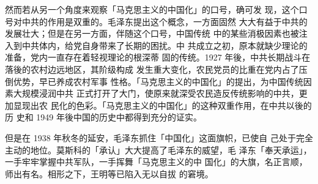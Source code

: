 然而若从另一个角度来观察「马克思主义的中国化」的口号，确可发
现，这个口号对中共的作用是双重的。毛泽东提出这个概念，一方面固然
大大有益于中共的发展壮大；但是在另一方面，伴随这个口号，中国传统
中的某些消极因素也被注入到中共体内，给党自身带来了长期的困扰。中
共成立之初，原本就缺少理论的准备，党内一直存在着轻视理论的根深蒂
固的传统。1927 年後，中共长期战斗在落後的农村边远地区，其阶级构成
发生重大变化，农民党员的比重在党内占了压倒优势，早已养成农村军事
性格。「马克思主义的中国化」的提出，为中国传统因素大规模浸润中共
正式打开了大门，使原来就深受农民造反传统影响的中共，更加显现出农
民化的色彩。「马克思主义的中国化」的这种双重作用，在中共以後的历
史和 1949 年後中国的历史中都得到充分的证实。

但是在 1938 年秋冬的延安，毛泽东抓住「中国化」这面旗帜，已使自
己处于完全主动的地位。莫斯科的「承认」大大提高了毛泽东的威望，毛
泽东「奉天承运」，一手牢牢掌握中共军队，一手挥舞「马克思主义的中
国化」的大旗，名正言顺，师出有名。相形之下，王明等已陷入无以自拔
的窘境。
